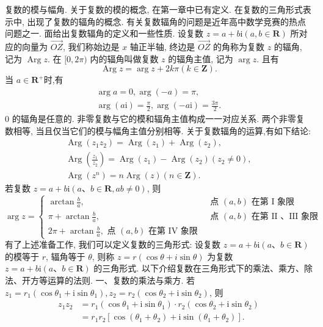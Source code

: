 
复数的模与幅角.
关于复数的模的概念, 在第一章中已有定义.
在复数的三角形式表示中, 出现了复数的辐角的概念.
有关复数辐角的问题是近年高中数学竞赛的热点问题之一.
面给出复数辐角的定义和一些性质.
设复数 $z=a+b \mathrm{i}(a, b \in \mathbf{R})$ 所对应的向量为 $\overrightarrow{O Z}$, 我们称始边是 $x$ 轴正半轴, 终边是 $\overrightarrow{O Z}$ 的角称为复数 $z$ 的辐角, 记为 $\operatorname{Arg} z$. 在 $[0,2 \pi)$ 内的辐角叫做复数 $z$ 的辐角主值, 记为 $\arg z$. 且有
$$
\operatorname{Arg} z=\arg z+2 k \pi(k \in \mathbf{Z}) .
$$
当 $a \in \mathbf{R}^{+}$时,有
$$
\begin{gathered}
\arg a=0, \arg (-a)=\pi, \\
\arg (a \mathrm{i})=\frac{\pi}{2}, \arg (-a \mathrm{i})=\frac{3 \pi}{2} .
\end{gathered}
$$
0 的辐角是任意的.
非零复数与它的模和辐角主值构成一一对应关系.
两个非零复数相等, 当且仅当它们的模与幅角主值分别相等.
关于复数辐角的运算,有如下结论:
$$
\begin{gathered}
\operatorname{Arg}\left(z_1 z_2\right)=\operatorname{Arg}\left(z_1\right)+\operatorname{Arg}\left(z_2\right), \\
\operatorname{Arg}\left(\frac{z_1}{z_2}\right)=\operatorname{Arg}\left(z_1\right)-\operatorname{Arg}\left(z_2\right)\left(z_2 \neq 0\right), \\
\operatorname{Arg}\left(z^n\right)=n \operatorname{Arg}(z)(n \in \mathbf{Z}) .
\end{gathered}
$$
若复数 $z=a+b \mathrm{i}(a 、 b \in \mathbf{R}, a b \neq 0)$, 则
$$
\arg z= \begin{cases}\arctan \frac{b}{a}, & \text { 点 }(a, b) \text { 在第 I 象限 } \\ \pi+\arctan \frac{b}{a}, & \text { 点 }(a, b) \text { 在第 II 、III 象限 } \\ 2 \pi+\arctan \frac{b}{a}, \text { 点 }(a, b) \text { 在第 IV 象限 }\end{cases}
$$
有了上述准备工作, 我们可以定义复数的三角形式:
设复数 $z=a+b \mathrm{i}(a 、 b \in \mathbf{R})$ 的模等于 $r$, 辐角等于 $\theta$, 则称 $z=r(\cos \theta+ i \sin \theta)$ 为复数 $z=a+b \mathrm{i}(a 、 b \in \mathbf{R})$ 的三角形式.
以下介绍复数在三角形式下的乘法、乘方、除法、开方等运算的法则.
一、复数的乘法与乘方.
若 $z_1=r_1\left(\cos \theta_1+\mathrm{i} \sin \theta_1\right), z_2=r_2\left(\cos \theta_2+\mathrm{i} \sin \theta_2\right)$, 则
$$
\begin{aligned}
z_1 z_2 & =r_1\left(\cos \theta_1+\mathrm{i} \sin \theta_1\right) \cdot r_2\left(\cos \theta_2+\mathrm{i} \sin \theta_2\right) \\
& =r_1 r_2\left[\cos \left(\theta_1+\theta_2\right)+\mathrm{i} \sin \left(\theta_1+\theta_2\right)\right] .
\end{aligned}
$$
